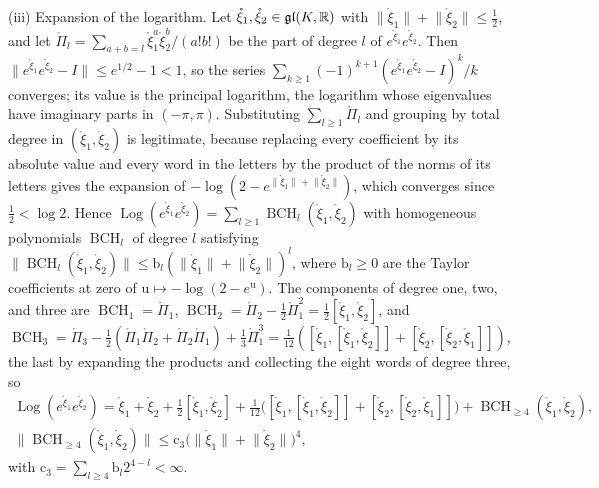 (iii) Expansion of the logarithm. Let \(\mathring\xi_1,\mathring\xi_2\in\mathfrak{gl}(K,\mathbb R)\) with
\(\lVert\mathring\xi_1\rVert+\lVert\mathring\xi_2\rVert\leq\frac12\), and let
\(\mathring\Pi_l=\sum_{a+b=l}\mathring\xi_1^a\mathring\xi_2^b/(a!b!)\) be the part of degree \(l\) of
\(e^{\mathring\xi_1}e^{\mathring\xi_2}\). Then \(\lVert e^{\mathring\xi_1}e^{\mathring\xi_2}-I\rVert\leq e^{1/2}-1<1\),
so the series \(\sum_{k\geq1}(-1)^{k+1}(e^{\mathring\xi_1}e^{\mathring\xi_2}-I)^k/k\) converges; its value is the
principal logarithm, the logarithm whose eigenvalues have imaginary parts in \((-\pi,\pi)\). Substituting
\(\sum_{l\geq1}\mathring\Pi_l\) and grouping by total degree in \((\mathring\xi_1,\mathring\xi_2)\) is
legitimate, because replacing every coefficient by its absolute value and every word in the letters by the
product of the norms of its letters gives the expansion of
\(-\log(2-e^{\lVert\mathring\xi_1\rVert+\lVert\mathring\xi_2\rVert})\), which converges since \(\frac12<\log2\).
Hence
\(\operatorname{Log}(e^{\mathring\xi_1}e^{\mathring\xi_2})=\sum_{l\geq1}\operatorname{BCH}_l(\mathring\xi_1,\mathring\xi_2)\)
with homogeneous polynomials \(\operatorname{BCH}_l\) of degree \(l\) satisfying
\(\lVert\operatorname{BCH}_l(\mathring\xi_1,\mathring\xi_2)\rVert\leq\mathrm b_l(\lVert\mathring\xi_1\rVert+\lVert\mathring\xi_2\rVert)^l\),
where \(\mathrm b_l\geq0\) are the Taylor coefficients at zero of \(\mathrm u\mapsto-\log(2-e^{\mathrm u})\). The
components of degree one, two, and three are \(\operatorname{BCH}_1=\mathring\Pi_1\),
\(\operatorname{BCH}_2=\mathring\Pi_2-\frac12\mathring\Pi_1^2=\frac12[\mathring\xi_1,\mathring\xi_2]\), and
\(\operatorname{BCH}_3=\mathring\Pi_3-\frac12(\mathring\Pi_1\mathring\Pi_2+\mathring\Pi_2\mathring\Pi_1)+\frac13\mathring\Pi_1^3
=\frac1{12}([\mathring\xi_1,[\mathring\xi_1,\mathring\xi_2]]+[\mathring\xi_2,[\mathring\xi_2,\mathring\xi_1]])\),
the last by expanding the products and collecting the eight words of degree three, so
\begin{equation}
\begin{gathered}
\operatorname{Log}(e^{\mathring\xi_1}e^{\mathring\xi_2})
=\mathring\xi_1+\mathring\xi_2+\tfrac12[\mathring\xi_1,\mathring\xi_2]
+\tfrac1{12}\bigl([\mathring\xi_1,[\mathring\xi_1,\mathring\xi_2]]+[\mathring\xi_2,[\mathring\xi_2,\mathring\xi_1]]\bigr)
+\operatorname{BCH}_{\geq4}(\mathring\xi_1,\mathring\xi_2),\\
\lVert\operatorname{BCH}_{\geq4}(\mathring\xi_1,\mathring\xi_2)\rVert\leq\mathrm c_3\bigl(\lVert\mathring\xi_1\rVert+\lVert\mathring\xi_2\rVert\bigr)^4,
\end{gathered}
\label{eq:link-bch-third}
\end{equation}
with \(\mathrm c_3=\sum_{l\geq4}\mathrm b_l2^{4-l}<\infty\).

